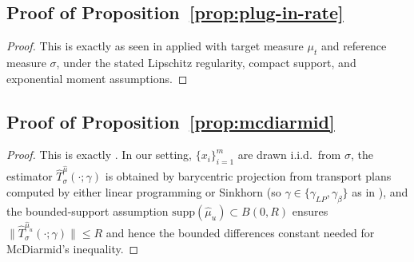 \documentclass[11pt]{article}
\newcommand{\1}{\mathbf{1}}
\begin{document}
\subsection{Proof of Proposition~\ref{prop:plug-in-rate}}
\label{app:proof-plugin-rate}
\begin{proof}
This is exactly \cite[Theorem~2.2]{deb2021rates} as seen in \cite[Theorem~B.1]{cloninger2023lotwassmap} applied with target measure $\mu_t$ and reference measure $\sigma$, under the stated Lipschitz regularity, compact support, and exponential moment assumptions.
\end{proof}

\subsection{Proof of Proposition~\ref{prop:mcdiarmid}}
\label{app:proof-mcdiarmid}
\begin{proof}
This is exactly \cite[Theorem~B.3]{cloninger2023lotwassmap}. In our setting, $\{x_i\}_{i=1}^m$ are drawn i.i.d.\ from $\sigma$, the estimator $\hat T_\sigma^{\hat\mu}(\cdot;\gamma)$ is obtained by barycentric projection from transport plans computed by either linear programming or Sinkhorn (so $\gamma\in\{\gamma_{LP},\gamma_\beta\}$ as in \cite[Appendix~B.2]{cloninger2023lotwassmap}),
and the bounded-support assumption $\mathrm{supp}(\hat\mu_u)\subset B(0,R)$ ensures $\|\hat T_\sigma^{\hat\mu_u}(\cdot;\gamma)\|\le R$ and hence the bounded differences constant needed for McDiarmid's inequality. \qedhere
\end{proof}
\end{document}

